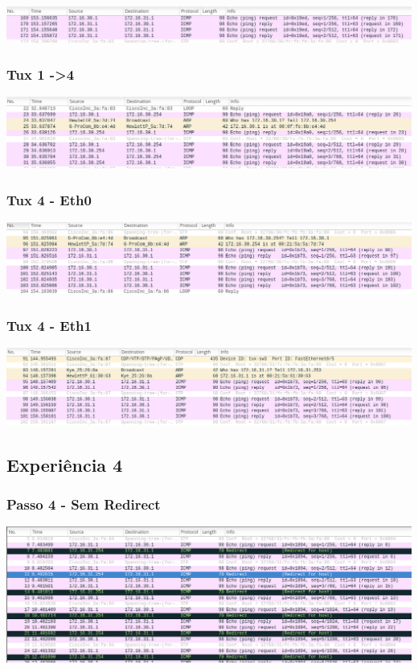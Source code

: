 \documentclass[a4paper]{article}
\begin{document}
\includegraphics[scale=0.35]{Exp3-Tux1-2.png}

\subsubsection{Tux 1 -\textgreater 4}

\includegraphics[scale=0.35]{Exp3-Tux1-4.png}

\subsubsection{Tux 4 - Eth0}

\includegraphics[scale=0.35]{Exp3-Tux4-eth0.png}

\subsubsection{Tux 4 - Eth1}

\includegraphics[scale=0.35]{Exp3-Tux4-eth1.png}

\subsection{Experiência 4}
\subsubsection{Passo 4 - Sem Redirect}

\includegraphics[scale=0.35]{Exp4-4-withoutRedirect.png}
\end{document}
